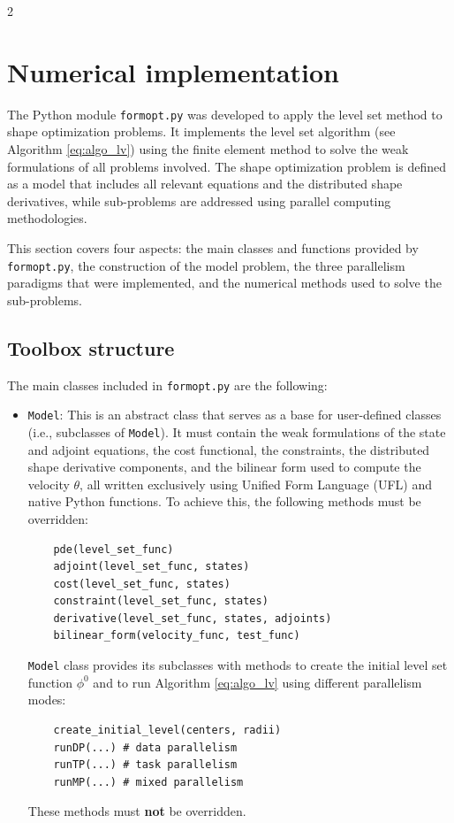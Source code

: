 \documentclass[a4paper, oneside]{article}
\newcommand{\code}[1]{\texttt{#1}}
\begin{document}
\begin{multicols}{2}
\section{Numerical implementation}\label{sec:numerics}

The Python module \code{formopt.py} was developed to apply
the level set method to shape optimization problems.
It implements the level set algorithm (see Algorithm \ref{eq:algo_lv}) using
the finite element method to solve the weak formulations of all problems involved.
The shape optimization problem is defined as a model that includes
all relevant equations and the distributed shape derivatives,
while sub-problems are addressed using parallel computing methodologies.

This section covers four aspects:
the main classes and functions provided by \code{formopt.py},
the construction of the model problem,
the three parallelism paradigms that were implemented,
and the numerical methods used to solve the sub-problems.

\subsection{Toolbox structure}
\label{sub:structure}

The main classes included in \code{formopt.py} are the following:
\begin{itemize}[left=0.0em]
\item \code{Model}:
This is an abstract class that serves as a base for user-defined classes
(i.e., subclasses of \code{Model}).
It must contain
the weak formulations of the state and adjoint equations,
the cost functional, the constraints,
the distributed shape derivative components, and
the bilinear form used to compute the velocity $\theta$, all written exclusively using Unified Form Language (UFL) and native Python functions.
To achieve this, the following methods must be overridden:
\begin{lstlisting}
	pde(level_set_func)
	adjoint(level_set_func, states)
	cost(level_set_func, states)
	constraint(level_set_func, states)
	derivative(level_set_func, states, adjoints)
	bilinear_form(velocity_func, test_func)
\end{lstlisting}
\code{Model} class provides its subclasses with
methods to create the initial level set function $\phi^0$
and to run Algorithm \ref{eq:algo_lv} using
different parallelism modes:
\begin{lstlisting}
	create_initial_level(centers, radii)
	runDP(...) # data parallelism
	runTP(...) # task parallelism
	runMP(...) # mixed parallelism
\end{lstlisting}
These methods must \textbf{not} be overridden.


\end{itemize}
\end{multicols}
\end{document}
